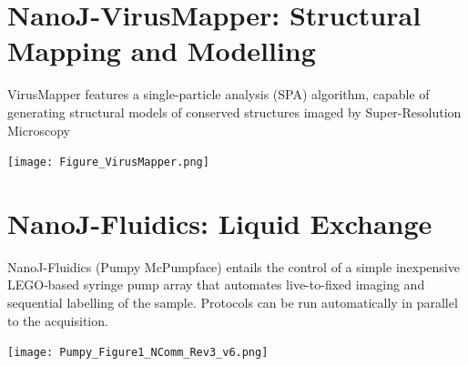 \documentclass[a0,portrait]{a0poster}
\begin{document}
\begin{multicols}{3}
\section*{NanoJ-VirusMapper: Structural Mapping and Modelling}

VirusMapper features a single-particle analysis (SPA) algorithm, capable of generating structural models of conserved structures imaged by Super-Resolution Microscopy

\begin{center}\vspace{1cm}
\texttt{[image: Figure\_VirusMapper.png]}
\end{center}%

\section*{NanoJ-Fluidics: Liquid Exchange}

NanoJ-Fluidics (Pumpy McPumpface) entails the control of a simple inexpensive LEGO-based syringe pump array that automates live-to-fixed imaging and sequential labelling of the sample. Protocols can be run automatically in parallel to the acquisition.

\begin{center}\vspace{1cm}
\texttt{[image: Pumpy\_Figure1\_NComm\_Rev3\_v6.png]}
\end{center}%



\end{multicols}
\end{document}
